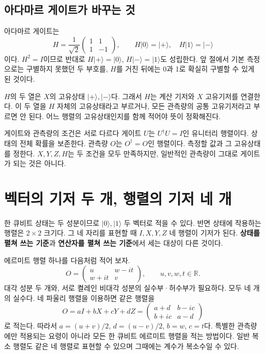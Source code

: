 \subsection{아다마르 게이트가 바꾸는 것}

아다마르 게이트는
\[
H=\frac1{\sqrt2}\begin{pmatrix}1&1\\1&-1\end{pmatrix},
\qquad H\lvert0\rangle=\lvert+\rangle,\quad
H\lvert1\rangle=\lvert-\rangle
\]
이다. \(H^2=I\)이므로 반대로 \(H\lvert+\rangle=\lvert0\rangle\),
\(H\lvert-\rangle=\lvert1\rangle\)도 성립한다.
앞 절에서 기본 측정으로는 구별하지 못했던 두 부호를, \(H\)를 거친 뒤에는
0과 1로 확실히 구별할 수 있게 된 것이다.

\(H\)의 두 열은 \(X\)의 고유상태 \(\lvert+\rangle,\lvert-\rangle\)다.
그래서 \(H\)는 계산 기저와 \(X\) 고유기저를 연결한다.
이 두 열을 \(H\) 자체의 고유상태라고 부르거나, 모든 관측량의 공통 고유기저라고
부르면 안 된다. 어느 행렬의 고유상태인지를 함께 적어야 뜻이 정확해진다.

\begin{notebox}{게이트와 관측량의 조건은 서로 다르다}
게이트 \(U\)는 \(U^\dagger U=I\)인 유니터리 행렬이다. 상태의 전체 확률을 보존한다.
관측량 \(O\)는 \(O^\dagger=O\)인 행렬이다. 측정할 값과 그 고유상태를 정한다.
\(X,Y,Z,H\)는 두 조건을 모두 만족하지만, 일반적인 관측량이 그대로 게이트가 되는 것은 아니다.
\end{notebox}

\section{벡터의 기저 두 개, 행렬의 기저 네 개}

한 큐비트 상태는 두 성분이므로 \(\lvert0\rangle,\lvert1\rangle\) 두 벡터로 적을 수 있다.
반면 상태에 작용하는 행렬은 \(2\times2\) 크기다. 그 네 자리를 표현할 때
\(I,X,Y,Z\) 네 행렬이 기저가 된다.
\textbf{상태를 펼쳐 쓰는 기준}과 \textbf{연산자를 펼쳐 쓰는 기준}에서 세는 대상이 다른 것이다.

에르미트 행렬 하나를 다음처럼 적어 보자.
\[
O=\begin{pmatrix}u&w-it\\w+it&v\end{pmatrix},
\qquad u,v,w,t\in\mathbb R.
\]
대각 성분 두 개와, 서로 켤레인 비대각 성분의 실수부·허수부가 필요하다.
모두 네 개의 실수다. 네 파울리 행렬을 이용하면 같은 행렬을
\[
O=aI+bX+cY+dZ
 =\begin{pmatrix}a+d&b-ic\\b+ic&a-d\end{pmatrix}
\]
로 적는다. 따라서 \(a=(u+v)/2\), \(d=(u-v)/2\), \(b=w\), \(c=t\)다.
특별한 관측량에만 적용되는 요령이 아니라 모든 한 큐비트 에르미트 행렬을 적는 방법이다.
일반 복소 행렬도 같은 네 행렬로 표현할 수 있으며 그때에는 계수가 복소수일 수 있다.

